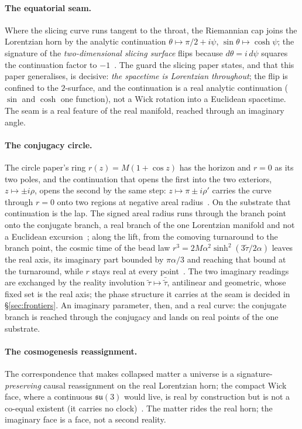 \documentclass[11pt,a4paper]{article}
\theoremstyle{definition}
\begin{document}
\paragraph{The equatorial seam.} Where the slicing curve runs tangent to
the throat, the Riemannian cap joins the Lorentzian horn by the analytic
continuation $\theta\mapsto\pi/2+i\psi$, $\sin\theta\mapsto\cosh\psi$; the
signature of the \emph{two-dimensional slicing surface} flips because
$d\theta=i\,d\psi$ squares the continuation factor to
$-1$~\cite[prop.~flip]{JanzenSlicing}. The guard the slicing paper states,
and that this paper generalises, is decisive: \emph{the spacetime is
Lorentzian throughout}; the flip is confined to the $2$-surface, and the
continuation is a real analytic continuation ($\sin$ and $\cosh$ one
function), not a Wick rotation into a Euclidean spacetime. The seam is a
real feature of the real manifold, reached through an imaginary angle.

\paragraph{The conjugacy circle.} The circle paper's ring $r(z)=M(1+\cos z)$
has the horizon and $r=0$ as its two poles, and the continuation that opens the
first into the two exteriors, $z\mapsto\pm i\rho$, opens the second by the same
step: $z\mapsto\pi\pm i\rho'$ carries the curve through $r=0$ onto two regions
at negative areal radius~\cite{JanzenCircle}. On the substrate that continuation
is the lap. The signed areal radius runs through the branch point onto the
conjugate branch, a real branch of the one Lorentzian manifold and not a
Euclidean excursion~\cite{JanzenSlicing}; along the lift, from the comoving
turnaround to the branch point, the cosmic time of the bead law
$r^{3}=2M\alpha^{2}\sinh^{2}(3\tilde\tau/2\alpha)$ leaves the real axis, its
imaginary part bounded by $\pi\alpha/3$ and reaching that bound at the
turnaround, while $r$ stays real at every point~\cite{JanzenCRframework}. The
two imaginary readings are exchanged by the reality involution
$\tilde\tau\mapsto\bar{\tilde\tau}$, antilinear and geometric, whose fixed set is
the real axis; the phase structure it carries at the seam is decided in
\S\ref{sec:frontiers}. An imaginary parameter, then, and a real curve: the
conjugate branch is reached through the conjugacy and lands on real points of the
one substrate.

\paragraph{The cosmogenesis reassignment.} The correspondence that makes
collapsed matter a universe is a signature-\emph{preserving} causal
reassignment on the real Lorentzian horn; the compact Wick face, where a
continuous $\mathfrak{su}(3)$ would live, is real by construction but is
not a co-equal existent (it carries no clock)~\cite[\S
decoupling, \S face-status]{JanzenBoundary}. The matter rides the real
horn; the imaginary face is a face, not a second reality.
\end{document}
